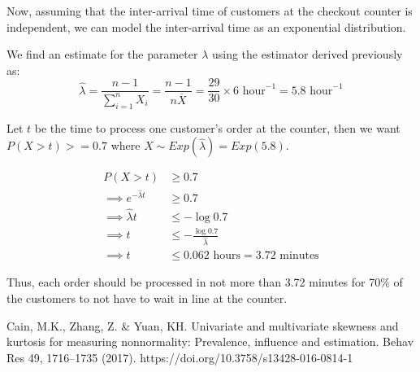 \documentclass[12pt, oneside]{article}
\begin{document}
\begin{enumerate}
{  Now, assuming that the inter-arrival time of customers at the checkout counter is independent,
  we can model the inter-arrival time as an exponential distribution.

  We find an estimate for the parameter \(\lambda\) using the estimator derived previously as:
  \[\widehat{\lambda} = \frac{n - 1}{\sum_{i=1}^{n} X_i} = \frac{n - 1}{n \overline{X}} = \frac{29}{30} \times 6 \text{ hour}^{-1} = 5.8 \text{ hour}^{-1}\]

  Let \(t\) be the time to process one customer's order at the counter, then we want
  \(P(X > t) >= 0.7\) where \(X \sim Exp(\widehat{\lambda}) = Exp(5.8)\).

  \begin{align*}
    P(X > t) &\geq 0.7 \\
    \implies e^{-\widehat{\lambda} t} &\geq 0.7 \\
    \implies \widehat{\lambda} t &\leq -\log{0.7} \\
    \implies t &\leq -\frac{\log{0.7}}{\widehat{\lambda}} \\
    \implies t &\leq 0.062 \text{ hours} = 3.72 \text{ minutes}
  \end{align*}

  Thus, each order should be processed in not more than 3.72 minutes for 70\% of the
  customers to not have to wait in line at the counter.
}


\end{enumerate}

\begin{thebibliography}{9}
  Cain, M.K., Zhang, Z. \& Yuan, KH. Univariate and multivariate skewness and kurtosis for measuring nonnormality: Prevalence, influence and estimation. Behav Res 49, 1716–1735 (2017). https://doi.org/10.3758/s13428-016-0814-1
  \end{thebibliography}
\end{document}
